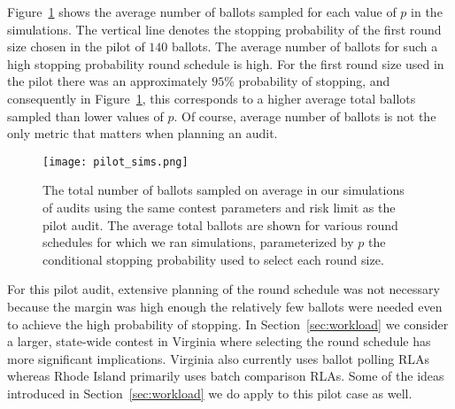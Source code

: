 Figure~\ref{fig:pilot_sims} shows the average number of ballots sampled for each value of $p$ in the simulations. The vertical line denotes the stopping probability of the first round size chosen in the pilot of $140$ ballots. The average number of ballots for such a high stopping probability round schedule is high. For the first round size used in the pilot there was an approximately $95\%$ probability of stopping, and consequently in Figure~\ref{fig:pilot_sims}, this corresponds to a higher average total ballots sampled than lower values of $p$. Of course, average number of ballots is not the only metric that matters when planning an audit. 


\begin{figure}
\texttt{[image: pilot\_sims.png]}
\caption{The total number of ballots sampled on average in our simulations of audits using the same contest parameters and risk limit as the pilot audit. The average total ballots are shown for various round schedules for which we ran simulations, parameterized by $p$ the conditional stopping probability used to select each round size.}
\label{fig:pilot_sims}
\end{figure}


For this pilot audit, extensive planning of the round schedule was not necessary because the margin was high enough the relatively few ballots were needed even to achieve the high probability of stopping. In Section~\ref{sec:workload} we consider a larger, state-wide contest in Virginia where selecting the round schedule has more significant implications. Virginia also currently uses ballot polling RLAs whereas Rhode Island primarily uses batch comparison RLAs. Some of the ideas introduced in Section~\ref{sec:workload} we do apply to this pilot case as well.

